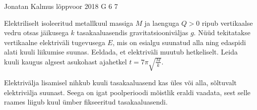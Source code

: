 {Jonatan Kalmus} %
{lõppvoor} %
{2018} %
{G 6} %
{7} %
{
\ifStatement
Elektriliselt isoleeritud metallkuul massiga $M$ ja laenguga $Q>0$ ripub vertikaalse vedru otsas jäikusega $k$ tasakaaluasendis gravitatsiooniväljas $g$. Nüüd tekitatakse vertikaalne elektriväli tugevusega $E$, mis on esialgu suunatud alla ning edaspidi alati kuuli liikumise suunas. Eeldada, et elektriväli muutub hetkeliselt. Leida kuuli kaugus algsest asukohast ajahetkel $t=7\pi \sqrt{\frac{M}{k}}$.
\fi


\ifHint
Elektrivälja lisamisel nihkub kuuli tasakaaluasend kas üles või alla, sõltuvalt elektrivälja suunast. Seega on igat poolperioodi mõistlik eraldi vaadata, sest selle raames liigub kuul ümber fikseeritud tasakaaluasendi.
\fi


}
